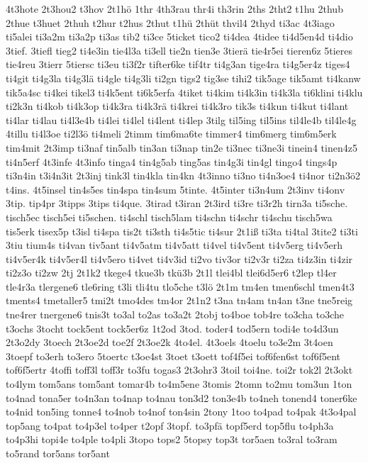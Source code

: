 {4t3hote
2t3hou2
t3hov
2t1hö
1thr
4th3rau
thr4i
th3rin
2ths
2tht2
t1hu
2thub
2thue
t3huet
2thuh
t2hur
t2hus
2thut
t1hü
2thüt
thvil4
2thyd
ti3ac
4t3iago
ti5alei
ti3a2m
ti3a2p
ti3as
tib2
ti3ce
5ticket
tico2
ti4dea
4tidee
ti4d5en4d
ti4dio
3tief.
3tiefl
tieg2
ti4e3in
tie4l3a
ti3ell
tie2n
tien3e
3tierä
tie4r5ei
tieren6z
5tieres
tie4reu
3tierr
5tiersc
ti3eu
ti3f2r
tifter6ke
tif4tr
ti4g3an
tige4ra
ti4g5er4z
tiges4
ti4git
ti4g3la
ti4g3lä
ti4gle
ti4g3li
ti2gn
tigs2
tig3se
tihi2
tik5age
tik5amt
ti4kanw
tik5a4sc
ti4kei
tikel3
ti4k5ent
ti6k5erfa
4tiket
ti4kim
ti4k3in
ti4k3la
ti6klini
ti4klu
ti2k3n
ti4kob
ti4k3op
ti4k3ra
ti4k3rä
ti4krei
ti4k3ro
tik3s
ti4kun
ti4kut
ti4lant
ti4lar
ti4lau
ti4l3e4b
ti4lei
ti4lel
ti4lent
ti4lep
3tilg
til5ing
til5ins
til4le4b
til4le4g
4tillu
ti4l3oe
ti2l3ö
ti4meli
2timm
tim6ma6te
timmer4
tim6merg
tim6m5erk
tim4mit
2t3imp
ti3naf
tin5alb
tin3an
ti3nap
tin2e
ti3nec
ti3ne3i
tinein4
tinen4z5
ti4n5erf
4t3infe
4t3info
tinga4
tin4g5ab
ting5as
tin4g3i
tin4gl
tingo4
tings4p
ti3n4in
t3i4n3it
2t3inj
tink3l
tin4kla
tin4kn
4t3inno
ti3no
ti4n3oe4
ti4nor
ti2n3ö2
t4ins.
4t5insel
tin4s5es
tin4spa
tin4sum
5tinte.
4t5inter
ti3n4um
2t3inv
ti4onv
3tip.
tip4pr
3tipps
3tips
ti4que.
3tirad
t3iran
2t3ird
ti3re
ti3r2h
tirn3a
ti5sche.
tisch5ec
tisch5ei
ti5schen.
ti4schl
tisch5lam
ti4schn
ti4schr
ti4schu
tisch5wa
tis5erk
tisex5p
t3isl
ti4spa
tis2t
ti3sth
ti4s5tic
ti4sur
2t1iß
ti3ta
ti4tal
3tite2
ti3ti
3tiu
tium4s
ti4van
tiv5ant
ti4v5atm
ti4v5att
ti4vel
ti4v5ent
ti4v5erg
ti4v5erh
ti4v5er4k
ti4v5er4l
ti4v5ero
ti4vet
ti4v3id
ti2vo
tiv3or
ti2v3r
ti2za
ti4z3in
ti4zir
ti2z3o
ti2zw
2tj
2t1k2
tkege4
tkue3b
tkü3b
2t1l
tlei4bl
tlei6d5er6
t2lep
tl4er
tle4r3a
tlergene6
tle6ring
t3li
tli4tu
tlo5che
t3lö
2t1m
tm4en
tmen6schl
tmen4t3
tments4
tmetaller5
tmi2t
tmo4des
tm4or
2t1n2
t3na
tn4am
tn4an
t3ne
tne5reig
tne4rer
tnergene6
tnis3t
to3al
to2as
to3a2t
2tobj
to4boe
tob4re
to3cha
to3che
t3ochs
3tocht
tock5ent
tock5er6z
1t2od
3tod.
toder4
tod5ern
todi4e
to4d3un
2t3o2dy
3toech
2t3oe2d
toe2f
2t3oe2k
4to4el.
4t3oels
4toelu
to3e2m
3t4oen
3toepf
to3erh
to3ero
5toertc
t3oe4st
3toet
t3oett
tof4f5ei
tof6fen6st
tof6f5ent
tof6f5ertr
4toffi
toff3l
toff3r
to3fu
togas3
2t3ohr3
3toil
toi4ne.
toi2r
tok2l
2t3okt
to4lym
tom5ans
tom5ant
tomar4b
to4m5ene
3tomis
2tomn
to2mu
tom3un
1ton
to4nad
tona5er
to4n3an
to4nap
to4nau
ton3d2
ton3e4b
to4neh
tonend4
toner6ke
to4nid
ton5ing
tonne4
to4nob
to4nof
ton4sin
2tony
1too
to4pad
to4pak
4t3o4pal
top5ang
to4pat
to4p3el
to4per
t2opf
3topf.
to3pfä
topf5erd
top5flu
to4ph3a
to4p3hi
topi4e
to4ple
to4pli
3topo
tops2
5topsy
top3t
tor5aen
to3ral
to3ram
to5rand
tor5ans
tor5ant
}
